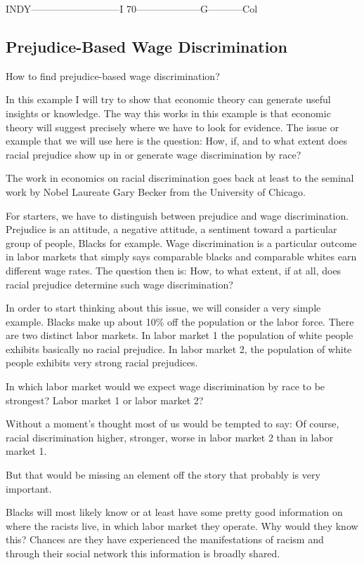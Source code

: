 \documentclass[
]{book}
\begin{document}
INDY---------------------------I 70--------------------G-----------Col

\hypertarget{prejudice-based-wage-discrimination}{%
\subsection{Prejudice-Based Wage Discrimination}\label{prejudice-based-wage-discrimination}}

How to find prejudice-based wage discrimination?

In this example I will try to show that economic theory can generate useful insights or knowledge. The way this works in this example is that economic theory will suggest precisely where we have to look for evidence. The issue or example that we will use here is the question:
How, if, and to what extent does racial prejudice show up in or generate wage discrimination by race?

The work in economics on racial discrimination goes back at least to the seminal work by Nobel Laureate Gary Becker from the University of Chicago.

For starters, we have to distinguish between prejudice and wage discrimination. Prejudice is an attitude, a negative attitude, a sentiment toward a particular group of people, Blacks for example. Wage discrimination is a particular outcome in labor markets that simply says comparable blacks and comparable whites earn different wage rates.
The question then is: How, to what extent, if at all, does racial prejudice determine such wage discrimination?

In order to start thinking about this issue, we will consider a very simple example. Blacks make up about 10\% off the population or the labor force. There are two distinct labor markets. In labor market 1 the population of white people exhibits basically no racial prejudice. In labor market 2, the population of white people exhibits very strong racial prejudices.

In which labor market would we expect wage discrimination by race to be strongest? Labor market 1 or labor market 2?

Without a moment's thought most of us would be tempted to say: Of course, racial discrimination higher, stronger, worse in labor market 2 than in labor market 1.

But that would be missing an element off the story that probably is very important.

Blacks will most likely know or at least have some pretty good information on where the racists live, in which labor market they operate. Why would they know this? Chances are they have experienced the manifestations of racism and through their social network this information is broadly shared.
\end{document}
